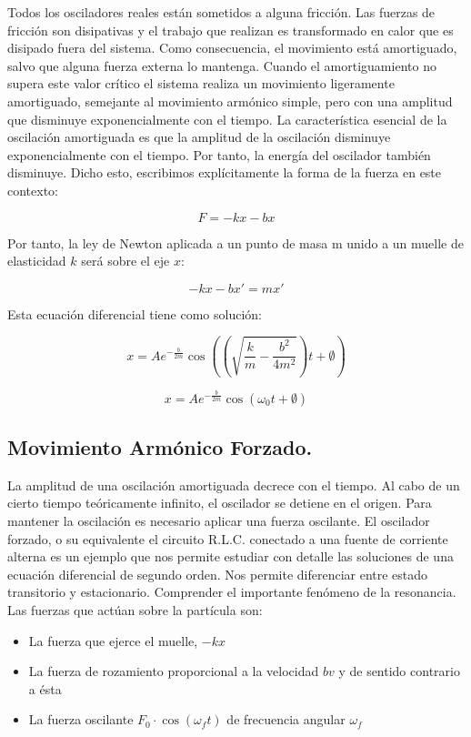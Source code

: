 \documentclass[11pt]{article}
\begin{document}
\begin{multicols}{2}
		Todos los osciladores reales están sometidos a alguna fricción. Las fuerzas de fricción son disipativas y el trabajo que realizan es transformado en calor que es disipado fuera del sistema. Como consecuencia, el movimiento está amortiguado, salvo que alguna fuerza externa lo mantenga. 
		Cuando el amortiguamiento no supera este valor crítico el sistema realiza un movimiento ligeramente amortiguado, semejante al movimiento armónico simple, pero con una amplitud que disminuye exponencialmente con el tiempo.
		La característica esencial de la oscilación amortiguada es que la amplitud de la oscilación disminuye exponencialmente con el tiempo. Por tanto, la energía del oscilador también disminuye.
		Dicho esto, escribimos explícitamente la forma de la fuerza en este contexto: 

		$$F = -kx - bx$$

		Por tanto, la ley de Newton aplicada a un punto de masa m unido a un muelle de elasticidad $k$ será sobre el eje $x$:

		$$-kx-bx' = mx'  $$

		Esta ecuación diferencial tiene como solución:

		$$x=Ae^{-\frac{b}{2m}}\cos{\left((\sqrt{\frac{k}{m}-\frac{b^2}{4m^2}})t+\emptyset\right)}$$

		$$x=Ae^{-\frac{b}{2m}}\cos{(\omega_0t+\emptyset)}$$

	\subsection{Movimiento Armónico Forzado.}

		La amplitud de una oscilación amortiguada decrece con el tiempo. Al cabo de un cierto tiempo teóricamente infinito, el oscilador se detiene en el origen. Para mantener la oscilación es necesario aplicar una fuerza oscilante.
		El oscilador forzado, o su equivalente el circuito R.L.C. conectado a una fuente de corriente alterna es un ejemplo que nos permite estudiar con detalle las soluciones de una ecuación diferencial de segundo orden. Nos permite diferenciar entre estado transitorio y estacionario. Comprender el importante fenómeno de la resonancia. 
		Las fuerzas que actúan sobre la partícula son:

		\begin{itemize}

			\item La fuerza que ejerce el muelle, $-kx$
			\item La fuerza de rozamiento proporcional a la velocidad $bv$ y de sentido contrario a ésta
			\item La fuerza oscilante $F_0\cdot\cos(\omega _ft)$ de frecuencia angular $\omega _f$


\end{itemize}
\end{multicols}
\end{document}
